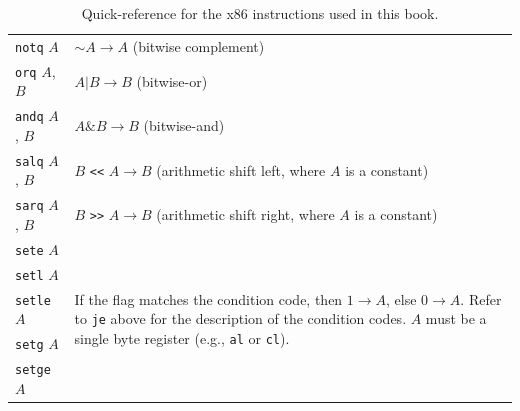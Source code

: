 \documentclass[7x10]{TimesAPriori_MIT}%
\def\racketEd{0}
\def\edition{0}
\numberwithin{theorem}{chapter}
\numberwithin{definition}{chapter}
\numberwithin{equation}{chapter}
\begin{document}
\begin{table}[tbp]
\begin{tabular}{l|l}
\texttt{notq} $A$ & $\sim A \to A$ \qquad (bitwise complement)\\
\texttt{orq} $A$, $B$ & $A | B \to B$ \qquad (bitwise-or)\\
\texttt{andq} $A$, $B$ & $A \& B \to B$ \qquad (bitwise-and)\\
\texttt{salq} $A$, $B$ & $B$ \texttt{<<} $A \to B$ (arithmetic shift left, where $A$ is a constant)\\
\texttt{sarq} $A$, $B$ & $B$ \texttt{>>} $A \to B$ (arithmetic shift right, where $A$ is a constant)\\
\texttt{sete} $A$ & \multirow{5}{3.7in}{If the flag matches the condition code,
   then $1 \to A$, else $0 \to A$. Refer to \texttt{je} above for the
   description of the condition codes. $A$ must be a single byte register
   (e.g., \texttt{al} or \texttt{cl}).} \\
\texttt{setl} $A$ & \\
\texttt{setle} $A$ & \\
\texttt{setg} $A$ & \\
\texttt{setge} $A$ &
\end{tabular}
\vspace{5pt}
  \caption{Quick-reference for the x86 instructions used in this book.}
  \label{tab:x86-instr}
\end{table}


\end{document}
